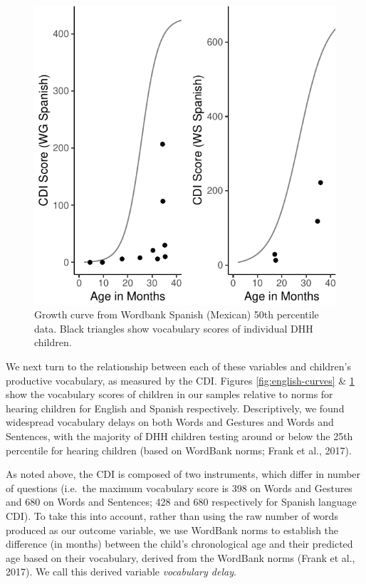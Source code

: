 \documentclass[english,man]{apa6}
\begin{document}
\begin{figure}
\centering
\includegraphics{ELSSP_paper_files/figure-latex/spanish-curves-1.pdf}
\caption{\label{fig:spanish-curves}Growth curve from Wordbank Spanish (Mexican) 50th percentile data. Black triangles show vocabulary scores of individual DHH children.}
\end{figure}

We next turn to the relationship between each of these variables and children's productive vocabulary, as measured by the CDI. Figures \ref{fig:english-curves} \& \ref{fig:spanish-curves} show the vocabulary scores of children in our samples relative to norms for hearing children for English and Spanish respectively. Descriptively, we found widespread vocabulary delays on both Words and Gestures and Words and Sentences, with the majority of DHH children testing around or below the 25th percentile for hearing children (based on WordBank norms; Frank et al., 2017).

As noted above, the CDI is composed of two instruments, which differ in number of questions (i.e.~the maximum vocabulary score is 398 on Words and Gestures and 680 on Words and Sentences; 428 and 680 respectively for Spanish language CDI). To take this into account, rather than using the raw number of words produced as our outcome variable, we use WordBank norms to establish the difference (in months) between the child's chronological age and their predicted age based on their vocabulary, derived from the WordBank norms (Frank et al., 2017). We call this derived variable \emph{vocabulary delay}.
\end{document}
